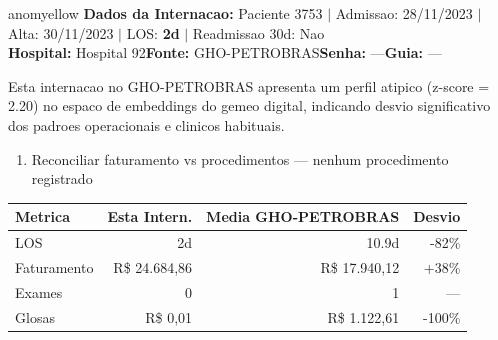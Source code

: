 \documentclass[a4paper,10pt]{article}
\begin{document}
\begin{anomalycard}[Internacao 71821 | GHO-PETROBRAS | MODERADO (z=2.20)]{anomyellow}
\textbf{Dados da Internacao:} Paciente 3753 $\mid$ Admissao: 28/11/2023 $\mid$ Alta: 30/11/2023 $\mid$ LOS: \textbf{2d} $\mid$ Readmissao 30d: Nao\\
\textbf{Hospital:} Hospital 92\quad\textbf{Fonte:} GHO-PETROBRAS\quad\textbf{Senha:} ---\quad\textbf{Guia:} ---\\
\vspace{2pt}\begin{tcolorbox}[colback=severityred!20,colframe=anomyellow,title={\textbf{Interpretacao de Negocio}},fonttitle=\bfseries\small,left=4pt,right=4pt,top=3pt,bottom=3pt]
{\small Esta internacao no GHO-PETROBRAS apresenta um perfil atipico (z-score = 2.20) no espaco de embeddings do gemeo digital, indicando desvio significativo dos padroes operacionais e clinicos habituais.}
\end{tcolorbox}
\begin{tcolorbox}[colback=severityyellow!30,colframe=anomorange,title={\textbf{Recomendacoes Especificas}},fonttitle=\bfseries\small,left=4pt,right=4pt,top=3pt,bottom=3pt]
\begin{enumerate}[nosep,leftmargin=16pt]
\item {\small Reconciliar faturamento vs procedimentos --- nenhum procedimento registrado}
\end{enumerate}
\end{tcolorbox}
\begin{center}\begin{tabular}{l r r r}\toprule\textbf{Metrica} & \textbf{Esta Intern.} & \textbf{Media GHO-PETROBRAS} & \textbf{Desvio} \\\midrule
LOS & 2d & 10.9d & -82\% \\
Faturamento & R\$ 24.684,86 & R\$ 17.940,12 & +38\% \\
Exames & 0 & 1 & --- \\
Glosas & R\$ 0,01 & R\$ 1.122,61 & -100\% \\
\bottomrule\end{tabular}\end{center}


\end{anomalycard}
\end{document}
